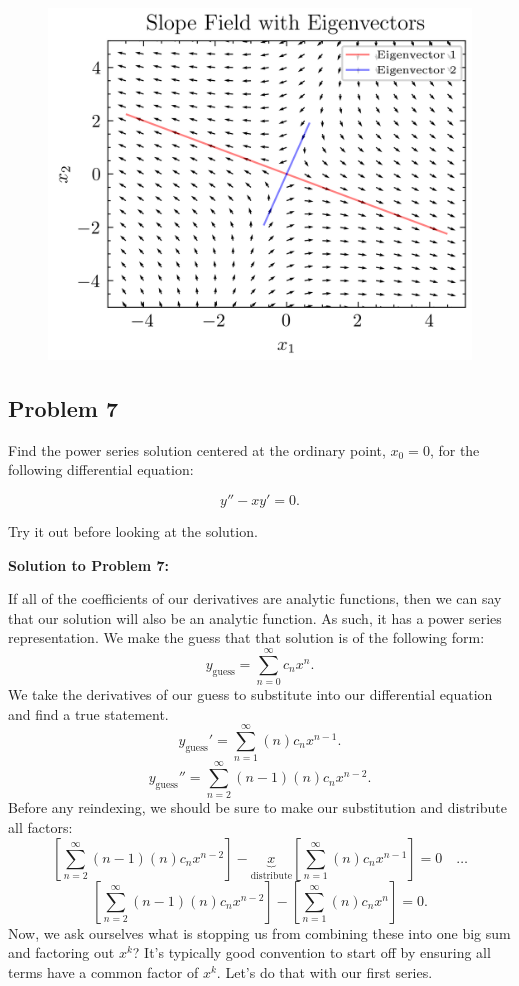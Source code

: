 \documentclass[a4paper,12pt]{article}
\begin{document}
\begin{figure}[ht!]
	\centering
	\includegraphics[scale=1.308]{slope-field.png}
\end{figure}
\pagebreak

\subsection*{Problem 7} Find the power series solution centered at the ordinary point, $x_0=0$, for the following differential equation:

$$ y''-xy'=0.$$

Try it out before looking at the solution.
\pagebreak

\textbf{Solution to Problem 7:}

If all of the coefficients of our derivatives are analytic functions, then we can say that our solution will also be an analytic function. As such, it has a power series representation. We make the guess that that solution is of the following form:
$$ y_{\text{guess}} = \sum_{n=0}^{\infty} c_nx^n. $$
We take the derivatives of our guess to substitute into our differential equation and find a true statement.
$$ y_{\text{guess}}' = \sum_{n=1}^{\infty} (n)c_nx^{n-1}. $$
$$ y_{\text{guess}}'' = \sum_{n=2}^{\infty}(n-1)(n)c_nx^{n-2}.$$
Before any reindexing, we should be sure to make our substitution and distribute all factors:
$$ \left[\sum_{n=2}^{\infty}(n-1)(n)c_nx^{n-2}\right] - \underbrace{x}_{\text{distribute}}\left[\sum_{n=1}^{\infty}(n)c_nx^{n-1}\right] = 0 \quad\ldots $$
$$ \left[\sum_{n=2}^{\infty}(n-1)(n)c_nx^{n-2}\right] -\left[\sum_{n=1}^{\infty}(n)c_nx^{n}\right] = 0. $$
Now, we ask ourselves what is stopping us from combining these into one big sum and factoring out $x^{k}$? It's typically good convention to start off by ensuring all terms have a common factor of $x^{k}$. Let's do that with our first series.\\
\end{document}
